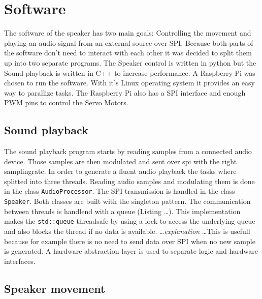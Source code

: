 \chapter{Software}

The software of the speaker has two main goals: Controlling the movement and playing an audio signal from an external source over SPI. Because both parts of the software don't need to interact with each other it was decided to split them up into two separate programs. The Speaker control is written in python but the Sound playback is written in C++ to increase performance.\p
%
A Raspberry Pi was chosen to run the software. With it's Linux operating system it provides an easy way to parallize tasks. The Raspberry Pi also has a SPI interface and enough PWM pins to control the Servo Motors.

\section{Sound playback}

The sound playback program starts by reading samples from a connected audio device. Those samples are then modulated and sent over spi with the right samplingrate. In order to generate a fluent audio playback the tasks where splitted into three threads.\p
Reading audio samples and modulating them is done in the class \lstinline{AudioProcessor}. The SPI transmission is handled in the class \lstinline{Speaker}. Both classes are built with the singleton pattern.
%
The communication between threads is handlend with a queue (Listing \dots). This implementation makes the \lstinline{std::queue} threadsafe by using a lock to access the underlying queue and also blocks the thread if no data is available. \dots \textit{explanation} \dots This is usefull because for example there is no need to send data over SPI when no new sample is generated.\p
%
A hardware abstraction layer is used to separate logic and hardware interfaces.





\section{Speaker movement}
